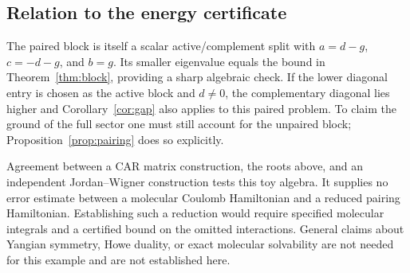 \subsection{Relation to the energy certificate}
The paired block is itself a scalar active/complement split with
$a=d-g$, $c=-d-g$, and $b=g$. Its smaller eigenvalue equals the bound
in Theorem~\ref{thm:block}, providing a sharp algebraic check. If the lower
diagonal entry is chosen as the active block and $d\ne0$, the complementary
diagonal lies higher and Corollary~\ref{cor:gap} also applies to this paired
problem. To claim the ground of the full sector one must still account for
the unpaired block; Proposition~\ref{prop:pairing} does so explicitly.

Agreement between a CAR matrix construction, the roots above, and an
independent Jordan--Wigner construction tests this toy algebra. It supplies no
error estimate between a molecular Coulomb Hamiltonian and a reduced pairing
Hamiltonian. Establishing such a reduction would require specified molecular
integrals and a certified bound on the omitted interactions. General claims
about Yangian symmetry, Howe duality, or exact molecular solvability are not
needed for this example and are not established here.
